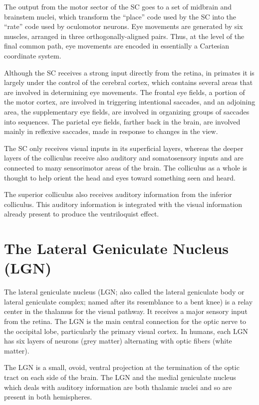 The output from the motor sector of the SC goes to a set of midbrain and brainstem nuclei, which transform the ``place'' code used by the SC into the ``rate'' code used by oculomotor neurons. Eye movements are generated by six muscles, arranged in three orthogonally-aligned pairs. Thus, at the level of the final common path, eye movements are encoded in essentially a Cartesian coordinate system.

Although the SC receives a strong input directly from the retina, in primates it is largely under the control of the cerebral cortex, which contains several areas that are involved in determining eye movements. The frontal eye fields, a portion of the motor cortex, are involved in triggering intentional saccades, and an adjoining area, the supplementary eye fields, are involved in organizing groups of saccades into sequences. The parietal eye fields, farther back in the brain, are involved mainly in reflexive saccades, made in response to changes in the view.

The SC only receives visual inputs in its superficial layers, whereas the deeper layers of the colliculus receive also auditory and somatosensory inputs and are connected to many sensorimotor areas of the brain. The colliculus as a whole is thought to help orient the head and eyes toward something seen and heard.

The superior colliculus also receives auditory information from the inferior colliculus. This auditory information is integrated with the visual information already present to produce the ventriloquist effect.

\hypertarget{the-lateral-geniculate-nucleus-lgn}{%
\section{The Lateral Geniculate Nucleus (LGN)}\label{the-lateral-geniculate-nucleus-lgn}}

The lateral geniculate nucleus (LGN; also called the lateral geniculate body or lateral geniculate complex; named after its resemblance to a bent knee) is a relay center in the thalamus for the visual pathway. It receives a major sensory input from the retina. The LGN is the main central connection for the optic nerve to the occipital lobe, particularly the primary visual cortex. In humans, each LGN has six layers of neurons (grey matter) alternating with optic fibers (white matter).

The LGN is a small, ovoid, ventral projection at the termination of the optic tract on each side of the brain. The LGN and the medial geniculate nucleus which deals with auditory information are both thalamic nuclei and so are present in both hemispheres.

